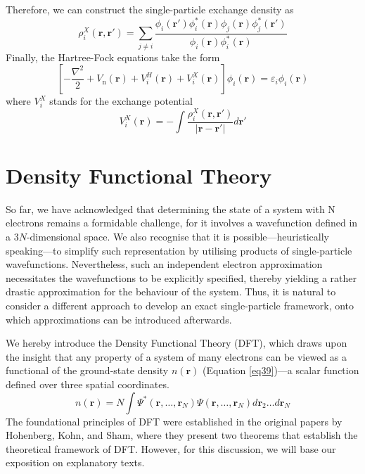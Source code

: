 Therefore, we can construct the single-particle exchange density as 
\begin{equation}
  \label{eq36}
  \rho^X_i(\mathbf{r}, \mathbf{r'}) = \sum_{j\neq i}\frac{\phi_i(\mathbf{r'})\phi^*_i(\mathbf{r})\phi_j(\mathbf{r})\phi^*_j(\mathbf{r'})}{\phi_i(\mathbf{r})\phi^*_i(\mathbf{r})}
\end{equation}
Finally, the Hartree-Fock equations take the form 
\begin{equation}
  \label{eq37}
  \left[-\frac{\nabla^2}{2} + V_{\text{n}}(\mathbf{r}) + V^H_i(\mathbf{r}) + V^X_i(\mathbf{r})\right]\phi_i(\mathbf{r}) = \varepsilon_i \phi_i(\mathbf{r})
\end{equation}
where $V^X_i$ stands for the exchange potential
\begin{equation}
  \label{eq38}
  V^X_i(\mathbf{r}) = -\int \frac{\rho^X_i(\mathbf{r}, \mathbf{r'})}{|\mathbf{r} - \mathbf{r'}|} d\mathbf{r'}
\end{equation}

\section{Density Functional Theory}
So far, we have acknowledged that determining the state of a system with N electrons remains a formidable challenge, for it involves a wavefunction defined in a $3N$-dimensional space. We also recognise that it is possible---heuristically speaking---to simplify such representation by utilising products of single-particle wavefunctions. Nevertheless, such an independent electron approximation necessitates the wavefunctions to be explicitly specified, thereby yielding a rather drastic approximation for the behaviour of the system. Thus, it is natural to consider a different approach to develop an exact single-particle framework, onto which approximations can be introduced afterwards.

We hereby introduce the Density Functional Theory (DFT), which draws upon the insight that any property of a system of many electrons can be viewed as a functional of the ground-state density $n(\mathbf{r})$\supercite{martin2020electronic} (Equation \ref{eq39})---a scalar function defined over three spatial coordinates. 
\begin{equation}
  n(\mathbf{r}) = N \int \Psi^*(\mathbf{r}, \ldots, \mathbf{r}_N) \Psi(\mathbf{r},\ldots, \mathbf{r}_N) d\mathbf{r}_2 \ldots d\mathbf{r}_N
  \label{eq39}
\end{equation}
The foundational principles of DFT were established in the original papers by Hohenberg, Kohn, and Sham\supercite{Hohenberg1964, Kohn1965}, where they present two theorems that establish the theoretical framework of DFT.
However, for this discussion, we will base our exposition on explanatory texts\supercite{martin2020electronic, giustino2014materials, kaxiras2003atomic, sholl2023density}.


